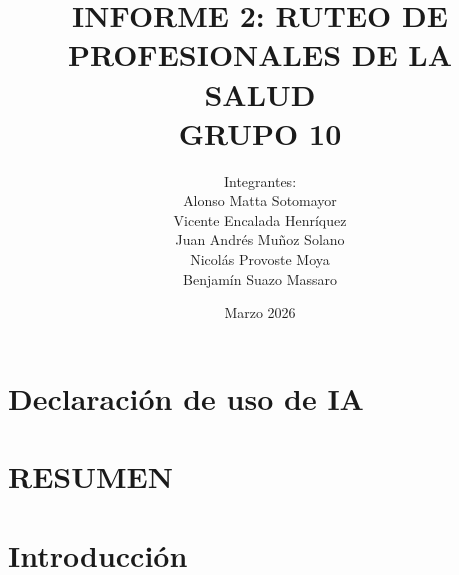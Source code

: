 \documentclass[pdftex,spanish]{pucthesis}
\begin{document}

\title[INFORME 2: RUTEO DE PROFESIONALES\\ GRUPO 10]
   {\bf INFORME 2: RUTEO DE PROFESIONALES DE LA SALUD\\ GRUPO 10}
\author[Integrantes:]{Integrantes:\\
\textnormal{\small{
Alonso Matta Sotomayor\\
Vicente Encalada Henríquez\\
Juan Andrés Muñoz Solano\\
Nicolás Provoste Moya\\
Benjamín Suazo Massaro}}
}

\address{Escuela de Ingenier\'ia\\
         Pontificia Universidad Cat\'olica de Chile\\ 
         Santiago, Chile}

\date{Marzo 2026}

\NoChapterPageNumber
{}
\maketitle

\chapter{Declaración de uso de IA}




\tableofcontents
\listoftables
\cleardoublepage


 \label{resumen}
\chapter*{RESUMEN}

\cleardoublepage



\chapter{Introducción} \label{ch:intro}

\end{document}

